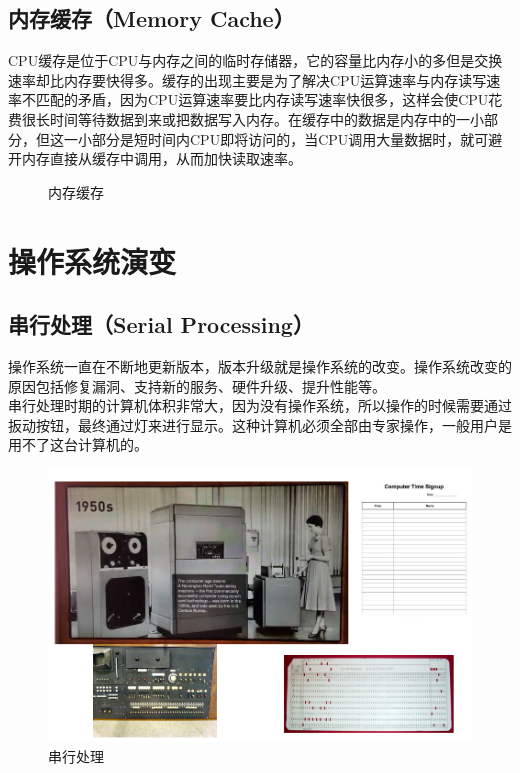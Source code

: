 \vspace{0.5cm}

\subsection{内存缓存（Memory Cache）}

CPU缓存是位于CPU与内存之间的临时存储器，它的容量比内存小的多但是交换速率却比内存要快得多。缓存的出现主要是为了解决CPU运算速率与内存读写速率不匹配的矛盾，因为CPU运算速率要比内存读写速率快很多，这样会使CPU花费很长时间等待数据到来或把数据写入内存。在缓存中的数据是内存中的一小部分，但这一小部分是短时间内CPU即将访问的，当CPU调用大量数据时，就可避开内存直接从缓存中调用，从而加快读取速率。

\begin{figure}[H]
    \centering
    \caption{内存缓存}
\end{figure}

\newpage

\section{操作系统演变}

\subsection{串行处理（Serial Processing）}

操作系统一直在不断地更新版本，版本升级就是操作系统的改变。操作系统改变的原因包括修复漏洞、支持新的服务、硬件升级、提升性能等。\\

串行处理时期的计算机体积非常大，因为没有操作系统，所以操作的时候需要通过扳动按钮，最终通过灯来进行显示。这种计算机必须全部由专家操作，一般用户是用不了这台计算机的。

\begin{figure}[H]
	\centering
	\includegraphics[scale=0.7]{img/C1/1-6/1.png}
	\caption{串行处理}
\end{figure}

